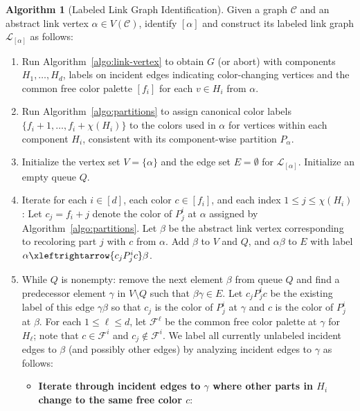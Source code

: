 \documentclass{amsart}
\theoremstyle{hypothesisstyle}
\theoremstyle{definition}
\newtheorem{algorithm}[alg]{Algorithm}
\theoremstyle{remark}
\numberwithin{equation}{section}
\newcommand{\C}{\mathcal C}
\begin{document}
\begin{algorithm}[Labeled Link Graph Identification]\label{algo:LLG}
    Given a graph $\C$ and an abstract link vertex $\alpha\in V(\C)$, identify $[\alpha]$ and construct its labeled link graph $\mathcal{L}_{[\alpha]}$ as follows:
\begin{enumerate}

\item\label{step:alg1-labels} Run Algorithm~\ref{algo:link-vertex} to obtain $G$ (or abort) with components $H_1,\dots,H_d$, labels on incident edges indicating color-changing vertices and the common free color palette $[f_i]$ for each $v\in H_i$ from $\alpha$.
\item\label{step:alg2-labels}  Run Algorithm~\ref{algo:partitions} to assign canonical color labels $\{f_i+1,\dots,f_i+\chi(H_i)\}$ to the colors used in $\alpha$ for vertices within each component $H_i$, consistent with its component-wise partition $P_\alpha$.
\item\label{step:initQ} Initialize the vertex set $V=\{\alpha\}$ and the edge set $E=\emptyset$ for $\mathcal{L}_{[\alpha]}$.  Initialize an empty queue $Q$.
\item\label{step:forloop}  Iterate for each $i\in[d]$, each color $c\in [f_i]$, and  each index $1\leq j\leq \chi(H_i)$: Let $c_j=f_i+j$ denote the color of $P_{j}^i$ at $\alpha$ assigned by Algorithm~\ref{algo:partitions}.  Let $\beta$ be the abstract link vertex corresponding to recoloring part $j$ with $c$ from $\alpha$.
 Add $\beta$ to $V$ and $Q$, and $\alpha\beta$ to $E$ with label  $\alpha \xleftrightarrow{c_jP^i_{j}c}  \beta$. 
\item\label{step:findalledges} While $Q$ is nonempty: remove the next element $\beta$ from queue $Q$ and find a predecessor element $\gamma$ in $V\setminus Q$ such that $\beta\gamma\in E$. Let $c_jP^i_jc$ be the existing label of this edge $\gamma\beta$ so that $c_j$ is the color of $P^i_j$ at $\gamma$ and $c$ is the color of $P^{i}_{j}$ at $\beta$. For each $1\leq \ell\leq d$, let $\mathcal{F}^{\ell}$ be the common free color palette at $\gamma$ for $H_{\ell}$; note that $c\in\mathcal{F}^i$ and $c_j\notin\mathcal{F}^i$.  We label all currently unlabeled incident edges to $\beta$ (and possibly other edges) by analyzing incident edges to $\gamma$ as follows:
\begin{itemize}
    \item[(a)]\label{step:alg3:six-cycles} {\bf Iterate through incident edges to $\gamma$ where other parts in $H_i$ change to the same free color $c$}: 
    

\end{itemize}
\end{enumerate}
\end{algorithm}
\end{document}
